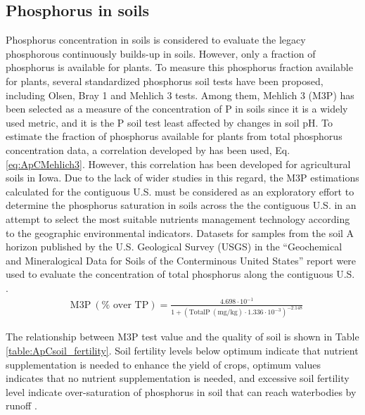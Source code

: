\begin{refsection}[referencesCh4]
\subsection{Phosphorus in soils}
Phosphorus concentration in soils is considered to evaluate the legacy phosphorous continuously builds-up in soils. However, only a fraction of phosphorus is available for plants. To measure this phosphorus fraction available for plants, several standardized phosphorus soil tests have been proposed, including Olsen, Bray 1 and Mehlich 3 tests. Among them,  Mehlich 3 (M3P) has been selected as a measure of the concentration of P in soils since it is a widely used metric, and it is the P soil test least affected by changes in soil pH. To estimate the fraction of phosphorus available for plants from total phosphorus concentration data, a correlation developed by \citet{AllenMallarino2006} has been used, Eq. \ref{eq:ApCMehlich3}. However, this correlation has been developed for agricultural soils in Iowa. Due to the lack of wider studies in this regard, the M3P estimations calculated for the contiguous U.S. must be considered as an exploratory effort to determine the phosphorus saturation in soils across the the contiguous U.S. in an attempt to select the most suitable nutrients management technology according to the geographic environmental indicators. Datasets for samples from the soil A horizon published by the U.S. Geological Survey (USGS) in the ``Geochemical and Mineralogical Data for Soils of the Conterminous United States'' report were used to evaluate the concentration of total phosphorus along the contiguous U.S. \citep{SoilsUSGS}.
\begin{align}
& \text{M3P} \ (\% \text{ over TP}) = \frac{4.698 \cdot 10^{-1}}{1+\left(\text{TotalP} \ (\text{mg}/\text{kg}) \cdot 1.336 \cdot 10^{-3}\right)^{-2.148}} \label{eq:ApCMehlich3}
\end{align}

The relationship between M3P test value and the quality of soil is shown in Table \ref{table:ApCsoil_fertility}. Soil fertility levels below optimum indicate that nutrient supplementation is needed to enhance the yield of crops, optimum values indicates that no nutrient supplementation is needed, and excessive soil fertility level indicate over-saturation of phosphorus in soil that can reach waterbodies by runoff \citep{Espinoza2006}.


\end{refsection}
